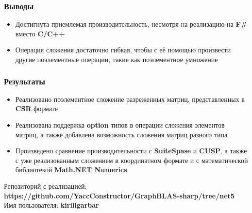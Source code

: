 \documentclass[aspectratio=169]{beamer}
\begin{document}
\begin{frame}
  \frametitle{Выводы}
  \begin{itemize}
    \item Достигнута приемлемая производительность, несмотря на реализацию на \textbf{F\#} вместо \textbf{C/C++}
    \item Операция сложения достаточно гибкая, чтобы с её помощью произвести другие поэлементные операции, такие как поэлементное умножение
  \end{itemize}
\end{frame}

\begin{frame}
  \frametitle{Результаты}
  \begin{itemize}
    \item Реализовано поэлементное сложение разреженных матриц, представленных в \textbf{CSR} формате
    \item Реализована поддержка \textbf{option} типов в операции сложения элементов матриц, а также добавлена возможность сложения матриц разного типа
    \item Произведено сравнение производительности с \textbf{SuiteSpase} и \textbf{CUSP}, а также с уже реализованным сложением в координатном формате и с математической библиотекой \textbf{Math.NET Numerics}
  \end{itemize}
  Репозиторий с реализацией: \textbf{https://github.com/YaccConstructor/GraphBLAS-sharp/tree/net5} \\
  Имя пользователя: \textbf{kirillgarbar}
\end{frame}
\end{document}
